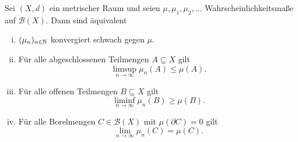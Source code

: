 
\begin{theorem}
    Sei $(X,d)$ ein metrischer Raum und seien $\mu, \mu_1, \mu_2,...$ Wahrscheinlichkeitsmaße auf $\mathcal{B}(X)$. Dann sind äquivalent
    \begin{enumerate}[(i)]
        \item $(\mu_n)_{n \in \mathbb{N}}$ konvergiert schwach gegen $\mu$.
        \item Für alle abgeschlossenen Teilmengen $A \subseteq X$ gilt 
        $$
            \limsup_{n \to \infty} \mu_n(A) \leq \mu(A).
        $$
        \item Für alle offenen Teilmengen $B \subseteq X$ gilt 
        $$
            \liminf_{n \to \infty} \mu_n(B) \geq \mu(B).
        $$
        \item Für alle Borelmengen $C \in \mathcal{B}(X)$ mit $\mu(\partial C) = 0$ gilt 
        $$
            \lim_{n \to \infty}\mu_n(C) = \mu(C).
        $$
    \end{enumerate}
\end{theorem}

